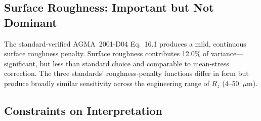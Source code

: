 \documentclass[12pt,a4paper]{article}
\begin{document}
\subsection{Surface Roughness: Important but Not Dominant}

The standard-verified AGMA~2001-D04 Eq.~16.1 produces a mild, continuous
surface roughness penalty. Surface roughness contributes 12.0\% of
variance---significant, but less than standard choice and comparable to
mean-stress correction. The three standards'
roughness-penalty functions differ in form but produce broadly similar
sensitivity across the engineering range of $R_z$ (4--50~$\mu$m).

\subsection{Constraints on Interpretation}
\end{document}
